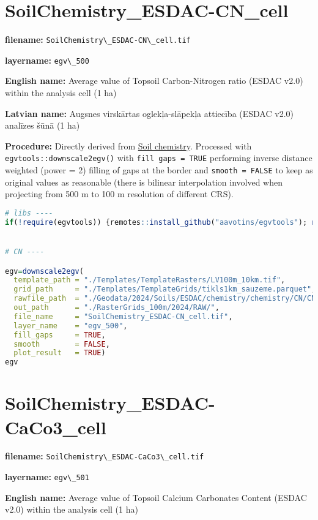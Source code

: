 \documentclass[
]{book}
\newcommand{\passthrough}[1]{#1}
\begin{document}
\section{SoilChemistry\_ESDAC-CN\_cell}\label{ch06.500}

\textbf{filename:} \passthrough{\lstinline!SoilChemistry\_ESDAC-CN\_cell.tif!}

\textbf{layername:} \passthrough{\lstinline!egv\_500!}

\textbf{English name:} Average value of Topsoil Carbon-Nitrogen ratio (ESDAC v2.0) within the analysis cell (1 ha)

\textbf{Latvian name:} Augsnes virskārtas oglekļa-slāpekļa attiecība (ESDAC v2.0) analīzes šūnā (1 ha)

\textbf{Procedure:} Directly derived from \hyperref[Ch04.07.01]{Soil chemistry}. Processed
with \passthrough{\lstinline!egvtools::downscale2egv()!} with \passthrough{\lstinline!fill gaps = TRUE!} performing inverse
distance weighted (power = 2) filling of gaps at the border and \passthrough{\lstinline!smooth = FALSE!}
to keep as original values as reasonable (there is bilinear interpolation
involved when projecting from 500 m to 100 m resolution of different CRS).

\begin{lstlisting}[language=R]
# libs ----
if(!require(egvtools)) {remotes::install_github("aavotins/egvtools"); require(egvtools)}


# CN ----

egv=downscale2egv(
  template_path = "./Templates/TemplateRasters/LV100m_10km.tif",
  grid_path     = "./Templates/TemplateGrids/tikls1km_sauzeme.parquet",
  rawfile_path  = "./Geodata/2024/Soils/ESDAC/chemistry/chemistry/CN/CN.tif",
  out_path      = "./RasterGrids_100m/2024/RAW/",
  file_name     = "SoilChemistry_ESDAC-CN_cell.tif",
  layer_name    = "egv_500",
  fill_gaps     = TRUE,
  smooth        = FALSE,
  plot_result   = TRUE)
egv
\end{lstlisting}

\section{SoilChemistry\_ESDAC-CaCo3\_cell}\label{ch06.501}

\textbf{filename:} \passthrough{\lstinline!SoilChemistry\_ESDAC-CaCo3\_cell.tif!}

\textbf{layername:} \passthrough{\lstinline!egv\_501!}

\textbf{English name:} Average value of Topsoil Calcium Carbonates Content (ESDAC v2.0) within the analysis cell (1 ha)
\end{document}
